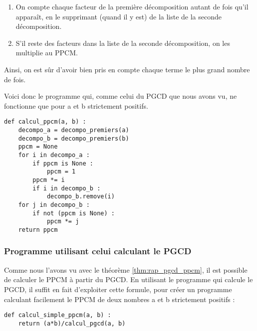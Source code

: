 \begin{enumerate}
    \item On compte chaque facteur de la première décomposition autant de fois qu'il apparaît, en le supprimant (quand il y est) de la liste de la seconde décomposition.
    \item S'il reste des facteurs dans la liste de la seconde décomposition, on les multiplie au PPCM.
\end{enumerate}
Ainsi, on est sûr d'avoir bien pris en compte chaque terme le plus grand nombre de fois.

Voici donc le programme qui, comme celui du PGCD que nous avons vu, ne fonctionne que pour a et b strictement positifs.

\begin{verbatim}
def calcul_ppcm(a, b) :
    decompo_a = decompo_premiers(a)
    decompo_b = decompo_premiers(b)
    ppcm = None
    for i in decompo_a :
        if ppcm is None :
            ppcm = 1
        ppcm *= i
        if i in decompo_b :
            decompo_b.remove(i)
    for j in decompo_b :
        if not (ppcm is None) :
            ppcm *= j
    return ppcm
\end{verbatim}

\subsubsection{Programme utilisant celui calculant le PGCD}

Comme nous l'avons vu avec le théorème \ref{thm:rap_pgcd_ppcm}, il est possible de calculer le PPCM à partir du PGCD. 
En utilisant le programme qui calcule le PGCD, il suffit en fait d'exploiter cette formule, pour créer un programme calculant facilement le PPCM de deux nombres a et b strictement positifs :

\begin{verbatim}
def calcul_simple_ppcm(a, b) :
    return (a*b)/calcul_pgcd(a, b)
\end{verbatim}